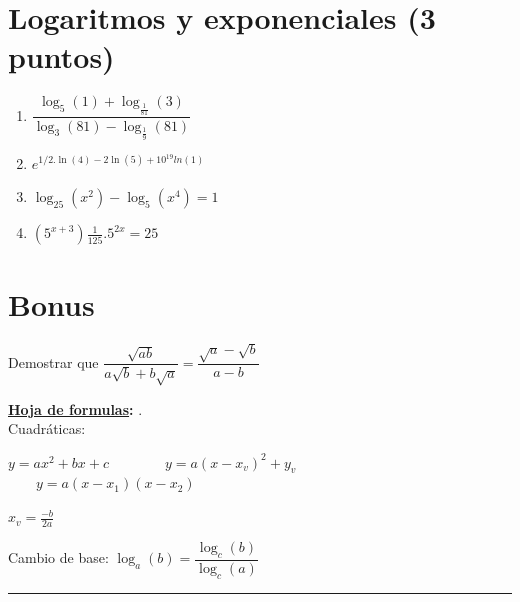 \documentclass[a4paper,11pt,spanish,sans]{exam}
\begin{document}
\section{Logaritmos y exponenciales (3 puntos)}
	\begin{enumerate}
		
		\item$ \dfrac{\log_5(1)+\log_{\frac{1}{81}}(3)}{\log_3(81)-\log_{\frac{1}{9}}(81)}$
		\item $e^{1/2.\ln(4)-2\ln(5)+10^{19}ln(1)}$
		\item $\log_{25}(x^2)-\log_5(x^4)=1$
		\item $(5^{x+3})\frac{1}{125}.5^{2x}=25 $
	\end{enumerate}
	
\section{Bonus}
	Demostrar que 
	$\dfrac{\sqrt{ab}}{a\sqrt{b}+b\sqrt{a}}=\dfrac{\sqrt{a}-\sqrt{b}}{a-b}$
	
		
\textbf{\underline{Hoja de formulas}:} . \\
		
Cuadráticas:
		
	$y=ax^2+bx+c \qquad $$\qquad y=a(x-x_v)^2+y_v \qquad$		$\qquad y=a(x-x_1)(x-x_2)$
	
	$x_v=\frac{-b}{2a}$
	
	Cambio de base: $\log_a(b)=\dfrac{\log_c(b)}{\log_c(a)}$
	
	\rule[2ex]{\textwidth}{1pt}
	
\end{document}
